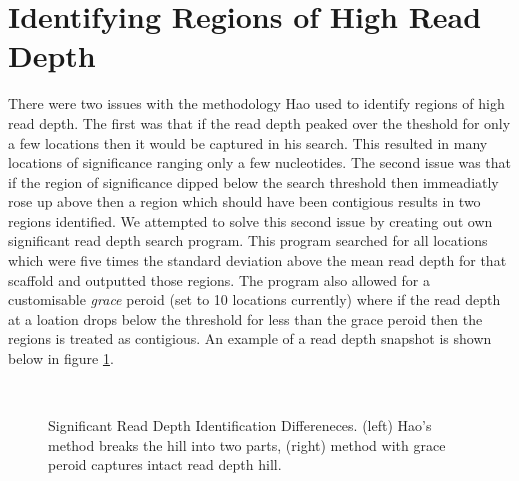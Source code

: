 \documentclass[12pt]{article}
\begin{document}
\section{Identifying Regions of High Read Depth}
	There were two issues with the methodology Hao used to identify regions of high read depth. The first was that if the read depth peaked over the theshold for only a few locations then it would be captured in his search. This resulted in many locations of significance ranging only a few nucleotides. The second issue was that if the region of significance dipped below the search threshold then immeadiatly rose up above then a region which should have been contigious results in two regions identified. We attempted to solve this second issue by creating out own significant read depth search program. This program searched for all locations which were five times the standard deviation above the mean read depth for that scaffold and outputted those regions. The program also allowed for a customisable \textit{grace} peroid (set to 10 locations currently) where if the read depth at a loation drops below the threshold for less than the grace peroid then the regions is treated as contigious. An example of a read depth snapshot is shown below in figure \ref{rdsnpstdevgrace}.
\begin{figure}[H]
	\begin{centering}
		\\
		\begin{singlespace}
			\vspace{-0.5cm}
			\caption[Significant Read Depth Identification Differeneces.]{Significant Read Depth Identification Differeneces. (left) Hao's method breaks the hill into two parts, (right) method with grace peroid captures intact read depth hill.}\label{rdsnpstdevgrace}
		\end{singlespace}
	\end{centering}
\end{figure}

%
%
\end{document}
